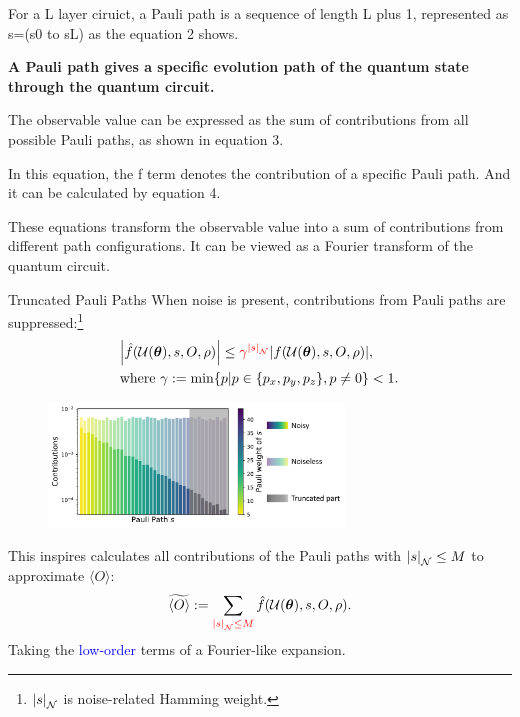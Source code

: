 \documentclass[10pt]{beamer}
\begin{document}
\begin{CJK}{UTF8}{gbsn}
{ For a L layer ciruict, a Pauli path is a sequence of length L plus 1, represented as s=(s0 to sL) as the equation 2 shows.
 

 \textbf{A Pauli path gives a specific evolution path of the quantum state through the quantum circuit.}

 The observable value can be expressed as the sum of contributions from all possible Pauli paths, as shown in equation 3.

 In this equation, the f term denotes the contribution of a specific Pauli path. And it can be calculated by equation 4.

 These equations transform the observable value into a sum of contributions from different path configurations. It can be viewed as a Fourier transform of the quantum circuit.
 }




\begin{frame}[fragile]{Truncated Pauli Paths}
  \vspace{-0.5em}
  When noise is present, contributions from Pauli paths are suppressed:\footnote{$\abs{s}_\mathcal{N}$ is noise-related Hamming weight.}
  \begin{equation}
  \begin{aligned}
      &\abs{\hat{f}(\mathcal{U}(\bm{\theta}),s,O,\rho)}\leq \textcolor{red}{\gamma^{\abs{s}_\mathcal{N}}} \abs{f(\mathcal{U}(\bm{\theta}),s,O,\rho)},\\
      &\text{where }  \gamma:=\min\{p|{p \in \{p_x,p_y,p_z\},p\neq 0}\} <1.
    \end{aligned}   
    \end{equation}
    \vspace{-1em}
  \begin{figure}
    \centering
    \includegraphics[width=0.7\textwidth]{fig/first.pdf}
  \end{figure}
  \vspace{-1em}
 This inspires calculates all contributions of the Pauli paths with $\abs{s}_\mathcal{N}\leq M$ to approximate ${\langle O \rangle}$:%
  \begin{equation}
 \widetilde{\langle O \rangle}:=\sum_{\textcolor{red}{\abs{s}_\mathcal{N}\leq M}} \hat{f}(\mathcal{U}(\bm{\theta}),s,O,\rho).
  \end{equation}
  Taking the \textcolor{blue}{low-order} terms of a Fourier-like expansion.
  \vspace{0.5em}
\end{frame}
\end{CJK}
\end{document}
